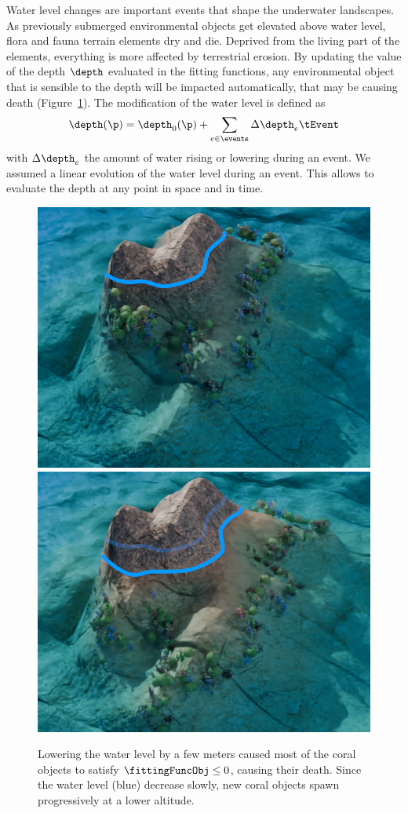 Water level changes are important events that shape the underwater landscapes. As previously submerged environmental objects get elevated above water level, flora and fauna terrain elements dry and die. Deprived from the living part of the elements, everything is more affected by terrestrial erosion. By updating the value of the depth $\depth$ evaluated in the fitting functions, any environmental object that is sensible to the depth will be impacted automatically, that may be causing death (Figure~\ref{fig:semantic-representation_water-event}). The modification of the water level is defined as 
\begin{align*}
    \depth(\p) = \depth_0(\p) + \sum_{e \in \events} \Delta \depth_e \tEvent
\end{align*}
with $\Delta \depth_e$ the amount of water rising or lowering during an event. We assumed a linear evolution of the water level during an event. This allows to evaluate the depth at any point in space and in time.

\begin{figure}
    \centering
    \includegraphics[width = 0.45 \linewidth]{Figures/Interactions/InteractionWater1.png}
    \includegraphics[width = 0.45 \linewidth]{Figures/Interactions/InteractionWater3.png}
    \caption{Lowering the water level by a few meters caused most of the coral objects to satisfy $\fittingFuncObj \leq 0$, causing their death. Since the water level (blue) decrease slowly, new coral objects spawn progressively at a lower altitude.}
    \label{fig:semantic-representation_water-event}
\end{figure}

